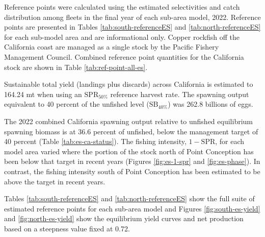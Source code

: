 \documentclass[11pt,
  english,
  letterpaper,
]{article}
\begin{document}
Reference points were calculated using the estimated selectivities and catch distribution among fleets in the final year of each sub-area model, 2022. Reference points are presented in Tables \ref{tab:south-referenceES} and \ref{tab:north-referenceES} for each sub-model area and are informational only. Copper rockfish off the California coast are managed as a single stock by the Pacific Fishery Management Council. Combined reference point quantities for the California stock are shown in Table \ref{tab:ref-point-all-es}.

Sustainable total yield (landings plus discards) across California is estimated to 164.24 mt when using an \(\text{SPR}_{50\%}\) reference harvest rate. The spawning output equivalent to 40 percent of the unfished level (\(\text{SB}_{40\%}\)) was 262.8 billions of eggs.

The 2022 combined California spawning output relative to unfished equilibrium spawning biomass is at 36.6 percent of unfished, below the management target of 40 percent (Table \ref{tab:es-ca-status}). The fishing intensity, \(1-\text{SPR}\), for each model area varied where the portion of the stock north of Point Conception has been below that target in recent years (Figures \ref{fig:es-1-spr} and \ref{fig:es-phase}). In contrast, the fishing intensity south of Point Conception has been estimated to be above the target in recent years.

Tables \ref{tab:south-referenceES} and \ref{tab:north-referenceES} show the full suite of estimated reference points for each sub-area model and Figures \ref{fig:south-es-yield} and \ref{fig:north-es-yield} show the equilibrium yield curves and net production based on a steepness value fixed at 0.72.

\newpage



\newpage



\begingroup\fontsize{10}{12}\selectfont
\begingroup\fontsize{10}{12}\selectfont
\end{document}
